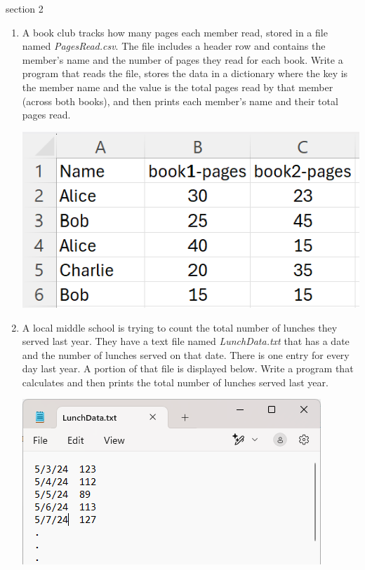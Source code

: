 \documentclass{article}
\begin{document}
section 2\\
\begin{enumerate}
	\item 
		A book club tracks how many pages each member read, stored in a file named 
		\textit{PagesRead.csv}. The file includes a header row and contains the member's 
		name and the number of pages they read for each book.  
		Write a program that reads the file, stores the data in a dictionary where the key is 
		the member name and the value is the total pages read by that member (across both books), 
		and then prints each member's name and their total pages read.
		
		\begin{flushright}
			\includegraphics[scale=.65]{imgs/PagesReadData.PNG}
		\end{flushright}


	\item 
		A local middle school is trying to count the total number of lunches they served last year.  
		They have a text file named \textit{LunchData.txt} that has a date and the number of lunches served on that date.    
		There is one entry for every day last year.  A portion of that file is displayed below.  
		Write a program that calculates and then prints the total number of lunches served last year. 
		\begin{flushright}
			\includegraphics[scale=.65]{imgs/LunchData.PNG}
		\end{flushright}





\end{enumerate}
\end{document}
